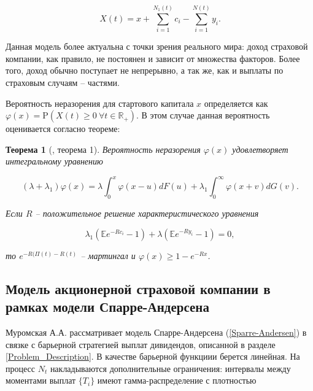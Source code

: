 \documentclass{article}
\theoremstyle{plain}
\newtheorem{theorem}{Теорема}[section]
\theoremstyle{plain}
\theoremstyle{plain}
\theoremstyle{plain}
\theoremstyle{definition}
\theoremstyle{remark}
\begin{document}
\begin{equation}
    X(t) = x + \displaystyle \sum_{i = 1}^{N_1(t)} c_i - \displaystyle \sum_{i = 1}^{N(t)} y_i.
\end{equation}


Данная модель более актуальна с точки зрения реального мира: доход страховой компании, как правило, не постоянен и зависит от множества факторов. Более того, доход обычно поступает не непрерывно, а так же, как и выплаты по страховым случаям -- частями.

Вероятность неразорения для стартового капитала $x$ определяется как $\varphi(x) = \mathrm{P}(X(t) \geq 0\ \forall t \in \mathbb{R}_+)$. В этом случае данная вероятность оценивается согласно теореме:

\begin{theorem}[\cite{KL_premium}, теорема 1]
    Вероятность неразорения $\varphi(x)$ удовлетворяет интегральному уравнению
    
    \begin{equation}
        (\lambda + \lambda_1) \varphi(x) = \lambda \displaystyle \int_0^x \varphi(x - u) dF(u) + \lambda_1 \displaystyle \int_0^{\infty} \varphi(x + v) dG(v).
    \end{equation}
    
    Если $R$ -- положительное решение характеристического уравнения
    
    \begin{equation}
        \lambda_1 (\mathbb{E} e^{-Rc_i} - 1) + \lambda (\mathbb{E} e^{-Ry_i} - 1) = 0,
    \end{equation}
    
    то $e^{-R(\Pi(t) - R(t)}$ -- мартингал и $\varphi(x) \geq 1 - e^{-Rx}$.
\end{theorem}


\subsection{Модель акционерной страховой компании в рамках модели Спарре-Андерсена}
\label{SA_dividents_subsection}

Муромская А.А. \cite{SA_dividends} рассматривает модель Спарре-Андерсена (\ref{Sparre-Andersen}) в связке с барьерной стратегией выплат дивидендов, описанной в разделе \ref{Problem_Description}. В качестве барьерной функциии берется линейная. На процесс $N_t$ накладываются дополнительные ограничения: интервалы между моментами выплат $\{ T_i \}$ имеют гамма-распределение с плотностью
\end{document}
